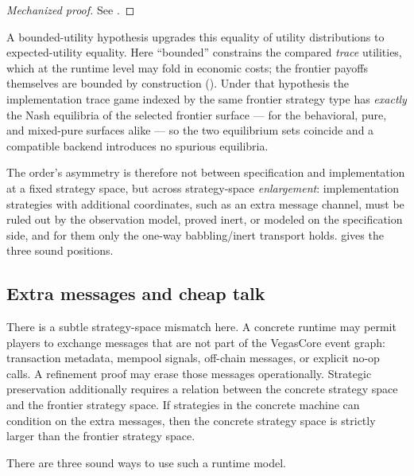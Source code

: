 \begin{proof}[Mechanized proof]
See .
\end{proof}

A bounded-utility hypothesis upgrades this equality of utility distributions
to expected-utility equality.  Here ``bounded'' constrains the compared
\emph{trace} utilities, which at the runtime level may fold in economic costs;
the frontier payoffs themselves are bounded by construction
().  Under that hypothesis the implementation trace
game indexed by the same frontier strategy type has \emph{exactly} the Nash
equilibria of the selected frontier surface --- for the behavioral, pure, and
mixed-pure surfaces alike --- so the two equilibrium sets coincide and a
compatible backend introduces no spurious equilibria.

The order's asymmetry is therefore not between specification and
implementation at a fixed strategy space, but across strategy-space
\emph{enlargement}: implementation strategies with additional coordinates,
such as an extra message channel, must be ruled out by the observation model,
proved inert, or modeled on the specification side, and for them only the
one-way babbling/inert transport holds.   gives the
three sound positions.

\subsection{Extra messages and cheap talk}
\label{sec:ref:cheap-talk}

There is a subtle strategy-space mismatch here.  A concrete runtime may
permit players to exchange messages that are not part of the VegasCore
event graph: transaction metadata, mempool signals, off-chain messages,
or explicit no-op calls.  A refinement proof may erase those messages
operationally.  Strategic preservation additionally requires a relation
between the concrete strategy space and the frontier strategy space.  If
strategies in the concrete machine can condition on the extra messages,
then the concrete strategy space is strictly larger than the frontier
strategy space.

There are three sound ways to use such a runtime model.

